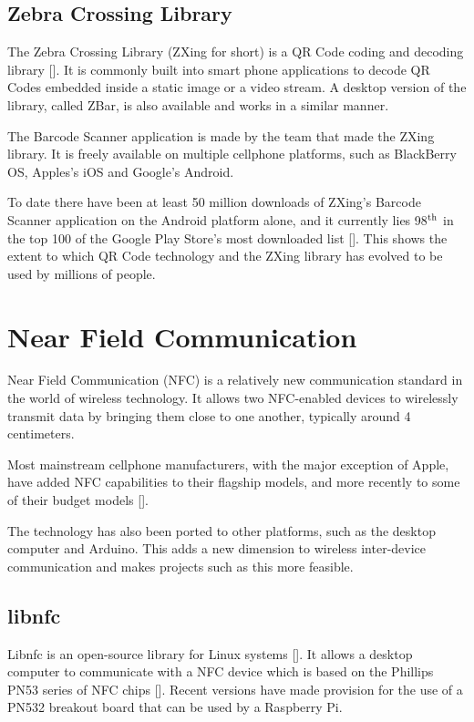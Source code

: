 \subsection{Zebra Crossing Library}
\label{sec:zbar}

The Zebra Crossing Library (ZXing for short) is a QR Code coding and decoding
library [\cite{website:zxing}]. It is commonly built into smart phone
applications to decode QR Codes embedded inside a static image or a video
stream. A desktop version of the library, called ZBar, is also available and
works in a similar manner.

The Barcode Scanner application is made by the team that made the ZXing
library. It is freely available on multiple cellphone platforms, such as
BlackBerry OS, Apples's iOS and Google's Android. 

To date there have been at least 50 million downloads of
ZXing's Barcode Scanner application on the Android platform alone, and it
currently lies 98$^{\rm th}$ in the top 100 of the Google Play Store's most
downloaded list [\cite{website:barcodescanner}]. This shows the extent to which
QR Code technology and the ZXing library has evolved to be used by millions of
people.

\section{Near Field Communication}

Near Field Communication (NFC) is a relatively new communication standard in the world of
wireless technology. It allows two NFC-enabled devices to wirelessly transmit data by bringing
them close to one another, typically around 4 centimeters.

Most mainstream cellphone manufacturers, with the major exception of Apple, have
added NFC capabilities to their flagship models, and more recently to some of
their budget models [\cite{website:nfc-models}]. 

The technology has also been
ported to other platforms, such as the desktop computer and Arduino. This adds a
new dimension to wireless inter-device communication and makes projects such as
this more feasible.

\subsection{libnfc}

Libnfc is an open-source library for Linux systems [\cite{website:libnfc}]. It allows a
desktop computer to communicate with a NFC device which is based on the Phillips PN53
series of NFC chips [\cite{website:libnfc-hardware}]. Recent versions have made provision
for the use of a PN532 breakout board that can be used by a Raspberry Pi. 

